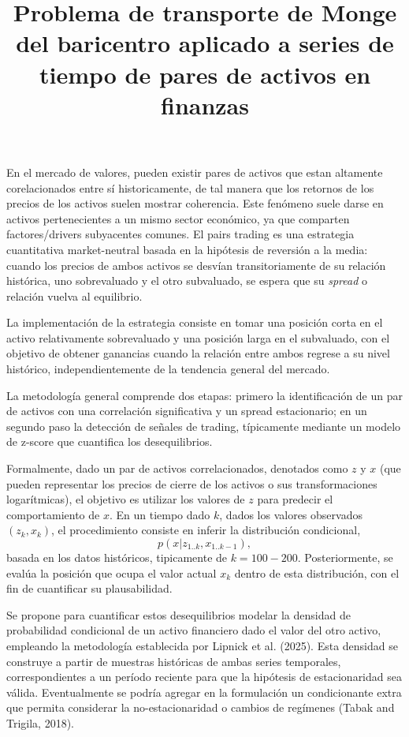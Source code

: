 \documentclass{myarticle}
\title{Problema de transporte de Monge del baricentro aplicado a series de tiempo de pares de activos en finanzas}
\begin{document}
\maketitle

En el mercado de valores, pueden existir pares de activos que estan altamente corelacionados entre s\'i historicamente,  de tal manera que los retornos de los precios de los activos suelen mostrar coherencia.  Este fenómeno suele darse en activos pertenecientes a un mismo sector económico, ya que comparten factores/drivers subyacentes comunes.   El pairs trading es una estrategia cuantitativa market-neutral basada en la hipótesis de reversión a la media: cuando los precios de ambos activos se desvían transitoriamente de su relación histórica, uno sobrevaluado y el otro subvaluado, se espera que su \emph{spread} o relación vuelva al equilibrio.

La implementación de la estrategia consiste en tomar una posición corta en el activo relativamente sobrevaluado y una posición larga en el subvaluado, con el objetivo de obtener ganancias cuando la relación entre ambos regrese a su nivel histórico, independientemente de la tendencia general del mercado.

La metodología general comprende dos etapas: primero la identificación de un par de activos con una correlación significativa y un spread estacionario; en un segundo paso la detección de señales de trading, típicamente mediante un modelo de z-score que cuantifica los desequilibrios.

Formalmente, dado un par de activos correlacionados, denotados como \( z \) y \( x \) (que pueden representar los precios de cierre de los activos o sus transformaciones logarítmicas), el objetivo es utilizar los valores de $z$ para predecir el comportamiento de \( x \). En un tiempo dado \( k \), dados los valores observados \( (z_k, x_k) \), el procedimiento consiste en inferir la distribución condicional, \[ p(x | z_{1..k},x_{1..k-1}), \] basada en los datos hist\'oricos, tipicamente de $k=100-200$. %
Posteriormente, se evalúa la posición que ocupa el valor actual \( x_k \) dentro de esta distribución, con el fin de cuantificar su plausabilidad.

Se propone para cuantificar estos desequilibrios modelar la densidad de probabilidad condicional de un activo financiero dado el valor del otro activo, empleando la metodología establecida por Lipnick et al. (2025). Esta densidad se construye a partir de muestras históricas de ambas series temporales, correspondientes a un período reciente para que la hip\'otesis de estacionaridad sea v\'alida. Eventualmente se podr\'ia agregar en la formulaci\'on un condicionante extra que permita considerar la no-estacionaridad o cambios de reg\'imenes (Tabak and Trigila, 2018).
\end{document}
